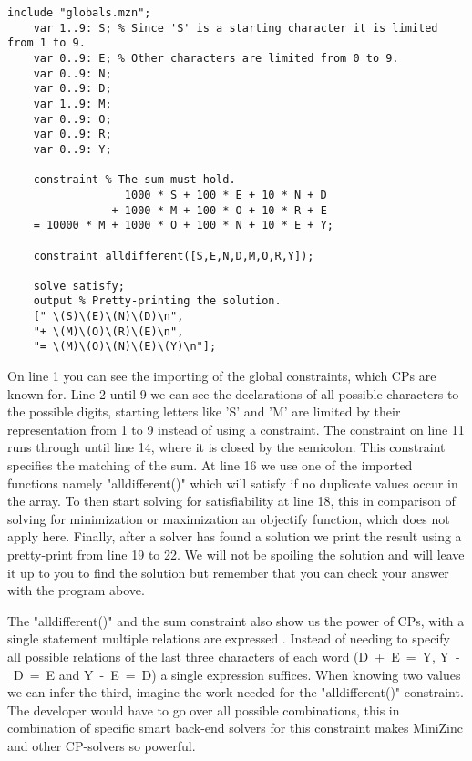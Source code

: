 \label{lst:SendMoreMoney}
\begin{lstlisting}[language=minizinc, caption={Solution to the puzzle "send more money" slightly modified from \url{https://www.minizinc.org/doc-2.5.5/en/downloads/send-more-money.mzn}}]
	include "globals.mzn";
	var 1..9: S; % Since 'S' is a starting character it is limited from 1 to 9.
	var 0..9: E; % Other characters are limited from 0 to 9.
	var 0..9: N;
	var 0..9: D;
	var 1..9: M;
	var 0..9: O;
	var 0..9: R;
	var 0..9: Y;
	
	constraint % The sum must hold.
	              1000 * S + 100 * E + 10 * N + D
	            + 1000 * M + 100 * O + 10 * R + E
	= 10000 * M + 1000 * O + 100 * N + 10 * E + Y;
	
	constraint alldifferent([S,E,N,D,M,O,R,Y]);
	
	solve satisfy;
	output % Pretty-printing the solution.
	[" \(S)\(E)\(N)\(D)\n",
	"+ \(M)\(O)\(R)\(E)\n",
	"= \(M)\(O)\(N)\(E)\(Y)\n"];
\end{lstlisting}
\label{sendMoreMoneyExplanation}
On line 1 you can see the importing of the global constraints, which CPs are known for. Line 2 until 9 we can see the declarations of all possible characters to the possible digits, starting letters like 'S' and 'M' are limited by their representation from 1 to 9 instead of using a constraint. The constraint on line 11 runs through until line 14, where it is closed by the semicolon. This constraint specifies the matching of the sum. At line 16 we use one of the imported functions namely "alldifferent()" which will satisfy if no duplicate values occur in the array. To then start solving for satisfiability at line 18, this in comparison of solving for minimization or maximization an objectify function, which does not apply here. Finally, after a solver has found a solution we print the result using a pretty-print from line 19 to 22.
We will not be spoiling the solution and will leave it up to you to find the solution but remember that you can check your answer with the program above.

The "alldifferent()" and the sum constraint also show us the power of CPs, with a single statement multiple relations are expressed \cite{53marriott1998programming}. Instead of needing to specify all possible relations of the last three characters of each word (\mbox{D + E = Y}, \mbox{Y - D = E} and \mbox{Y - E = D}) a single expression suffices. When knowing two values we can infer the third, imagine the work needed for the "alldifferent()" constraint. The developer would have to go over all possible combinations, this in combination of specific smart back-end solvers for this constraint makes MiniZinc and other CP-solvers so powerful. 

